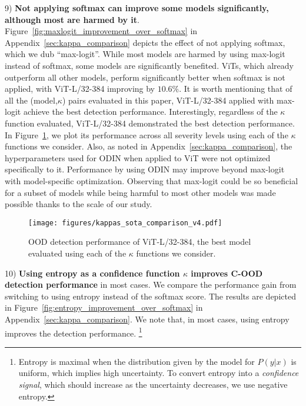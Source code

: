 \documentclass[table]{article} \usepackage{PRIMEarxiv}
\begin{document}
9) \textbf{Not applying softmax can improve some models significantly, although most are harmed by it}.
Figure~\ref{fig:maxlogit_improvement_over_softmax} in Appendix~\ref{sec:kappa_comparison} depicts the effect of not applying softmax, which we dub ``max-logit''. While most models are harmed by using max-logit instead of softmax, some models are significantly benefited. ViTs, which already outperform all other models, perform significantly better when softmax is not applied, with \textcolor{myteal}{ViT-L/32-384} improving by $10.6\%$.
It is worth mentioning that of all the (model,$\kappa$) pairs evaluated in this paper, \textcolor{myteal}{ViT-L/32-384} applied with max-logit achieve the best detection performance. Interestingly, regardless of the $\kappa$ function evaluated, \textcolor{myteal}{ViT-L/32-384} demonstrated the best detection performance. In Figure~\ref{fig:mean_kappa_comparison}, we plot its performance across all severity levels using each of the $\kappa$ functions we consider. Also, as noted in Appendix~\ref{sec:kappa_comparison}, the hyperparameters used for ODIN when applied to ViT were not optimized specifically to it. Performance by using ODIN may improve beyond max-logit with model-specific optimization.
Observing that max-logit could be so beneficial for a subset of models while being harmful to most other models was made possible thanks to the scale of our study.
\begin{figure}[h]
    \centering
    \texttt{[image: figures/kappas\_sota\_comparison\_v4.pdf]}
    \caption{OOD detection performance of ViT-L/32-384, the best model evaluated using each of the $\kappa$ functions we consider. }
    \label{fig:mean_kappa_comparison}
\end{figure}

10) \textbf{Using entropy as a confidence function $\kappa$ improves C-OOD detection performance} in most cases.
We compare the performance gain from switching to using entropy instead of the softmax  score. The results are depicted in Figure~\ref{fig:entropy_improvement_over_softmax} in Appendix~\ref{sec:kappa_comparison}. We note that, in most cases, using entropy improves the detection performance.
\footnote{Entropy is maximal when the distribution given by the model for $P(y|x)$ is uniform, which implies high uncertainty. To convert entropy into a \emph{confidence signal}, which should increase as the uncertainty decreases, we use negative entropy.}
\end{document}
